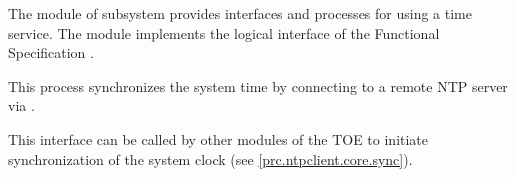 



The module  of subsystem 
provides interfaces and processes for using a time service. The module
implements the logical interface  of the Functional
Specification \autocite[Section~3.2.6]{adv_fsp}.



This process synchronizes the system time by connecting to a remote NTP server
via .




This interface can be called by other modules of the TOE to initiate
synchronization of the system clock (see \autoref{prc.ntpclient.core.sync}).






